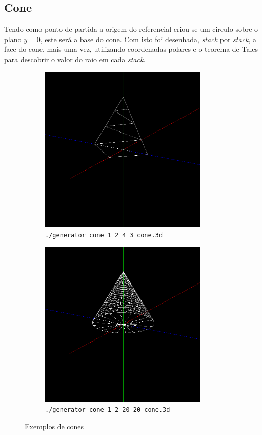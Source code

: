 \documentclass[11pt,a4paper]{report}
\begin{document}
\subsection{Cone}
\vspace{0.5cm}
Tendo como ponto de partida a origem do referencial criou-se um circulo sobre o plano \textit{$y = 0$}, este será a base do cone. Com isto foi desenhada, \textit{stack} por \textit{stack}, a face do cone, mais uma vez, utilizando coordenadas polares e o teorema de Tales para descobrir o valor do raio em cada \textit{stack}.
\vspace{1cm}
\begin{figure}[H]
\centering
\begin{subfigure}{0.5\textwidth}
  \centering
  \includegraphics[width = 8cm,height = 8cm]{cone1.png}
  \caption{\texttt{./generator cone 1 2 4 3 cone.3d}}
  \label{fig:cone1}
\end{subfigure}%
\begin{subfigure}{0.5\textwidth}
  \centering
  \includegraphics[width = 8cm,height = 8cm]{cone2.png}
  \caption{\texttt{./generator cone 1 2 20 20 cone.3d}}
  \label{fig:cone2}
\end{subfigure}
\caption{Exemplos de cones}
\label{fig:cone}
\end{figure}
\newpage
\end{document}
